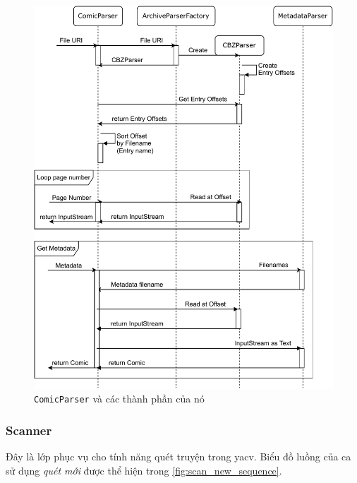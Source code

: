 \documentclass[../../../../thesis]{subfiles}
\begin{document}
\begin{figure}[H]
    \centering
    \includegraphics[scale=0.8]{../images/parser_sequence.pdf}
    \caption{\texttt{ComicParser} và các thành phần của nó}
    \label{fig:parser_sequence}
\end{figure}



\subsubsection{Scanner}

Đây là lớp phục vụ cho tính năng quét truyện trong yacv. Biểu đồ luồng của ca sử
dụng \emph{quét mới} được thể hiện trong \autoref{fig:scan_new_sequence}.
\end{document}

